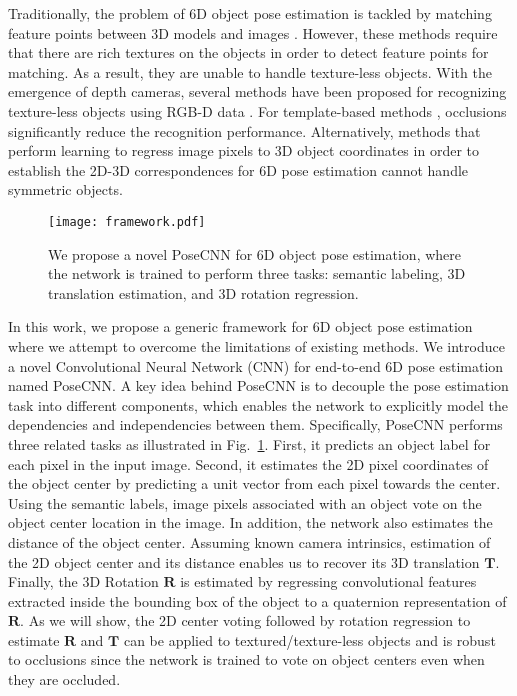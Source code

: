 \documentclass[conference]{IEEEtran}
\begin{document}
Traditionally, the problem of 6D object pose estimation is tackled by matching feature points between 3D models and images \cite{lowe1999object,rothganger20063d,collet2011moped}. However, these methods require that there are rich textures on the objects in order to detect feature points for matching. As a result, they are unable to handle texture-less objects. With the emergence of depth cameras, several methods have been proposed for recognizing texture-less objects using RGB-D data \cite{hinterstoisser2012model,brachmann2014learning,Bo14Lea,schwarz2015rgb,kehl2016deep}. For template-based methods \cite{hinterstoisser2012model,hinterstoisser2012gradient}, occlusions significantly reduce the recognition performance. Alternatively, methods that perform learning to regress image pixels to 3D object coordinates in order to establish the 2D-3D correspondences for 6D pose estimation \cite{brachmann2014learning,brachmann2016uncertainty} cannot handle symmetric objects.

\begin{figure}
	\centering
	\texttt{[image: framework.pdf]}
	\caption{We propose a novel PoseCNN for 6D object pose estimation, where the network is trained to perform three tasks: semantic labeling, 3D translation estimation, and 3D rotation regression.}
	\label{fig:framework}
	\vspace{-8mm}
\end{figure}

In this work, we propose a generic framework for 6D object pose estimation where we attempt to overcome the limitations of existing methods. We introduce a novel Convolutional Neural Network (CNN) for end-to-end 6D pose estimation named PoseCNN. A key idea behind PoseCNN is to decouple the pose estimation task into different components, which enables the network to explicitly model the dependencies and independencies between them. Specifically, PoseCNN performs three related tasks as illustrated in Fig.~\ref{fig:framework}. First, it predicts an object label for each pixel in the input image. Second, it estimates the 2D pixel coordinates of the object center by predicting a unit vector from each pixel towards the center. Using the semantic labels, image pixels associated with an object vote on the object center location in the image. In addition, the network also estimates the distance of the object center. Assuming known camera intrinsics, estimation of the 2D object center and its distance enables us to recover its 3D translation $\mathbf{T}$. Finally, the 3D Rotation $\mathbf{R}$ is estimated by regressing convolutional features extracted inside the bounding box of the object to a quaternion representation of $\mathbf{R}$. As we will show, the 2D center voting followed by rotation regression to estimate $\mathbf{R}$ and $\mathbf{T}$ can be applied to textured/texture-less objects and is robust to occlusions since the network is trained to vote on object centers even when they are occluded.
\end{document}
